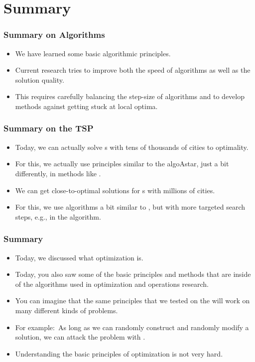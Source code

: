 \documentclass[aspectratio=169,mathserif,notheorems]{beamer}%
\begin{document}
\section{Summary}%
%
\begin{frame}[t]%
\frametitle{Summary on Algorithms}%
\begin{itemize}%
\item We have learned some basic algorithmic principles.%
%
\item<2-> Current research tries to improve both the speed of algorithms as well as the solution quality.%
%
\item<3-> This requires carefully balancing the step-size of algorithms and to develop methods against getting stuck at local optima.%
\end{itemize}%
\end{frame}%
%
\begin{frame}[t]%
\frametitle{Summary on the TSP}%
\begin{itemize}%
\item Today, we can actually solve s with tens of thousands of cities to optimality\cite{ABCC2006TTSPACS,C2013WT}.%
%
\item<2-> For this, we actually use principles similar to the \gls{algoAstar}, just a bit differently, in methods\cite{ABCC2006TTSPACS,CEG2005CWDPIFT} like \cite{LMSK1963AAFTTSP}.%
%
\item<3-> We can get close-to-optimal solutions for s with millions of cities.%
%
\item<4-> For this, we use algorithms a bit similar to , but with more targeted search steps, e.g., in the  algorithm\cite{H2009GKOSFTLKTH,H2000AEIOTLKTSH}.%
%
\end{itemize}%
\end{frame}%
%
\begin{frame}%
\frametitle{Summary}%
\begin{itemize}%
\item Today, we discussed what optimization is.%
%
\item<2-> Today, you also saw some of the basic principles and methods that are inside of the algorithms used in optimization and operations research.%
%
\item<3-> You can imagine that the same principles that we tested on the  will work on many different kinds of problems.%
%
\item<4-> For example:~As long as we can randomly construct and randomly modify a solution, we can attack the problem with .%
%
\item<5-> Understanding the basic principles of optimization is not very hard.%
%
\end{itemize}%
\end{frame}%
%
%
%
\endPresentation%
\end{document}
